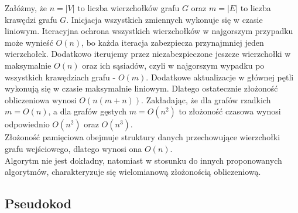     Załóżmy, że $n = |V|$ to liczba wierzchołków grafu $G$ oraz $m = |E|$ to liczba krawędzi grafu $G$. 
    Inicjacja wszystkich zmiennych wykonuje się w czasie liniowym. Iteracyjna ochrona wszystkich wierzchołków w najgorszym przypadku może wynieść $O(n)$, bo każda iteracja zabezpiecza przynajmniej jeden wierzchołek. Dodatkowo iterujemy przez niezabezpieczone jeszcze wierzchołki w maksymalnie $O(n)$ oraz ich sąsiadów, czyli w najgorszym wypadku po wszystkich krawędziach grafu - $O(m)$. Dodatkowe aktualizacje w głównej pętli wykonują się w czasie maksymalnie liniowym. Dlatego ostatecznie złożoność obliczeniowa wynosi $O(n(m+n))$. Zakładając, że dla grafów rzadkich $m=O(n)$, a dla grafów gęstych $m=O(n^2)$ to złożoność czasowa wynosi odpowiednio $O(n^2)$ oraz $O(n^3)$.\\
    Złożoność pamięciowa obejmuje struktury danych przechowujące wierzchołki grafu wejściowego, dlatego wynosi ona $O(n)$.\\
    Algorytm nie jest dokładny, natomiast w stosunku do innych proponowanych algorytmów, charakteryzuje się wielomianową złożonością obliczeniową.
    
    \subsection{Pseudokod}

